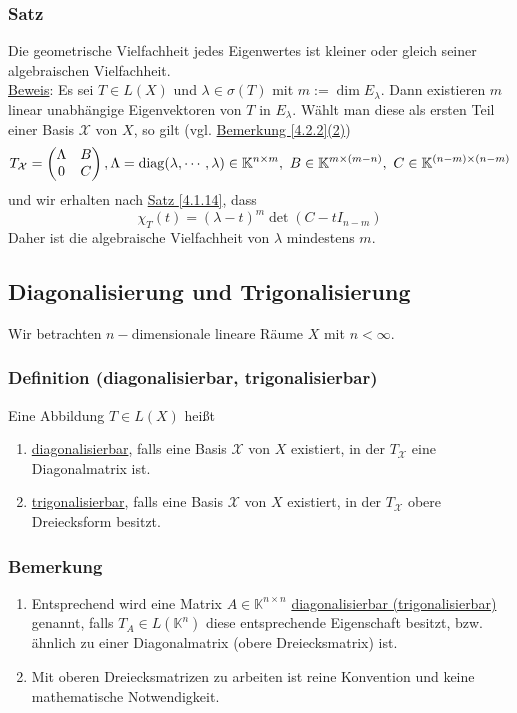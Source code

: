 \subsubsection{Satz}
\label{4.3.7}
Die geometrische Vielfachheit jedes Eigenwertes ist kleiner oder gleich seiner algebraischen Vielfachheit.\\
\underline{Beweis}: Es sei $T\in L(X)$ und $\lambda \in \sigma (T)$ mit $m:=\dim E_\lambda$.  Dann existieren $m$ linear unabhängige Eigenvektoren von $T$ in $E_\lambda$.  Wählt man diese als ersten Teil einer Basis $\mathcal{X}$ von $X$, so gilt (vgl. \hyperref[4.2.2]{Bemerkung \ref{4.2.2}(2)})
\[T_\mathcal{X} =\begin{pmatrix}\Lambda & B\\ 0 & C\end{pmatrix}, \Lambda=\diag(\lambda ,\cdots ,\lambda )\in\mathbb{K}^{n\times m},\ B\in\mathbb{K}^{m\times (m-n)},\ C\in\mathbb{K}^{(n-m)\times (n-m)}\]
und wir erhalten nach \hyperref[4.1.14]{Satz \ref{4.1.14}}, dass
\[\chi _T(t)=(\lambda -t)^m \det (C-tI_{n-m})\]
Daher ist die algebraische Vielfachheit von $\lambda$ mindestens $m$.
\subsection{Diagonalisierung und Trigonalisierung}
Wir betrachten $n-$dimensionale lineare Räume $X$ mit $n<\infty$.
\subsubsection{Definition (diagonalisierbar, trigonalisierbar)}
Eine Abbildung $T\in L(X)$ heißt
\renewcommand{\labelenumi}{(\alph{enumi})}
\begin{enumerate}
\item \underline{diagonalisierbar}, falls eine Basis $\mathcal{X}$ von $X$ existiert, in der $T_\mathcal{X}$ eine Diagonalmatrix ist.
\item \underline{trigonalisierbar}, falls eine Basis $\mathcal{X}$ von $X$ existiert, in der $T_\mathcal{X}$ obere Dreiecksform besitzt.
\end{enumerate}
\subsubsection{Bemerkung}
\renewcommand{\labelenumi}{(\arabic{enumi})}
\begin{enumerate}
\item Entsprechend wird eine Matrix $A\in \mathbb{K}^{n\times n}$ \underline{diagonalisierbar (trigonalisierbar)} genannt, falls $T_A\in L(\mathbb{K}^n)$ diese entsprechende Eigenschaft besitzt, bzw. ähnlich zu einer Diagonalmatrix (obere Dreiecksmatrix) ist.
\item Mit oberen Dreiecksmatrizen zu arbeiten ist reine Konvention und keine mathematische Notwendigkeit.
\end{enumerate}
